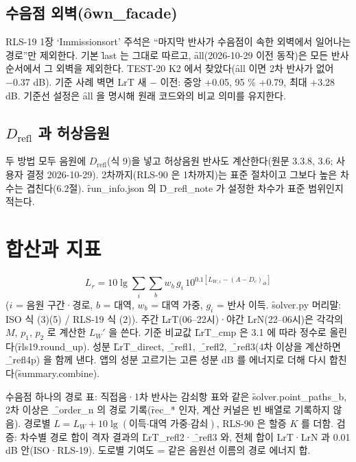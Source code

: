 \documentclass[10.5pt,a4paper]{article}
\begin{document}
\subsection{수음점 외벽(\f{own\_facade})}
RLS-19 1장 ‘Immissionsort’ 주석은 ``마지막 반사가 수음점이 속한 외벽에서 일어나는 경로''만 제외한다. 기본 \f{last} 는 그대로 따르고, \f{all}(2026-10-29 이전 동작)은 모든 반사 순서에서 그 외벽을 제외한다. TEST-20 K2 에서 찾았다(\f{all} 이면 2차 반사가 없어 −0.37 dB). 기준 사례 벽면 LrT 새 − 이전: 중앙 +0.05, 95 \% +0.79, 최대 +3.28 dB. 기준선 설정은 \f{all} 을 명시해 원래 코드와의 비교 의미를 유지한다.

\subsection{$D_\mathrm{refl}$ 과 허상음원}
두 방법 모두 음원에 $D_\mathrm{refl}$(식 9)을 넣고 허상음원 반사도 계산한다(원문 3.3.8, 3.6; 사용자 결정 2026-10-29). 2차까지(RLS-90 은 1차까지)는 표준 절차이고 그보다 높은 차수는 겹친다(6.2절). \f{run\_info.json} 의 \f{D\_refl\_note} 가 설정한 차수가 표준 범위인지 적는다.

\section{합산과 지표}
\begin{equation*}
L_r = 10\lg \sum_i \sum_b w_b\, g_i\, 10^{0.1[L_{W,i} - (A - D_c)_{ib}]}
\end{equation*}
($i$ = 음원 구간·경로, $b$ = 대역, $w_b$ = 대역 가중, $g_i$ = 반사 이득. \f{solver.py} 머리말: ISO 식 (3)(5) / RLS-19 식 (2)). 주간 LrT(06–22시)·야간 LrN(22–06시)은 각각의 $M$, $p_1$, $p_2$ 로 계산한 $L_W'$ 을 쓴다. 기준 비교값 \f{LrT\_cmp} 은 3.1 에 따라 정수로 올린다(\f{rls19.round\_up}). 성분 \f{LrT\_direct}, \f{\_refl1}, \f{\_refl2}, \f{\_refl3}(4차 이상을 계산하면 \f{\_refl4p}) 을 함께 낸다. 앱의 성분 고르기는 고른 성분 dB 를 에너지로 더해 다시 합친다(\f{summary.combine}).

 수음점 하나의 경로 표: 직접음·1차 반사는 감쇠항 표와 같은 \f{solver.point\_paths\_b}, 2차 이상은 \f{\_order\_n} 의 경로 기록(\f{rec\_*} 인자, 계산 커널은 빈 배열로 기록하지 않음). 경로별 $L = L_W + 10\lg(\text{이득·대역 가중·감쇠})$, RLS-90 은 할증 $K$ 를 더함. 검증: 차수별 경로 합이 격자 결과의 \f{LrT\_refl2}·\f{\_refl3} 와, 전체 합이 LrT·LrN 과 0.01 dB 안(ISO·RLS-19). 도로별 기여도 = 같은 음원선 이름의 경로 에너지 합.
\end{document}
